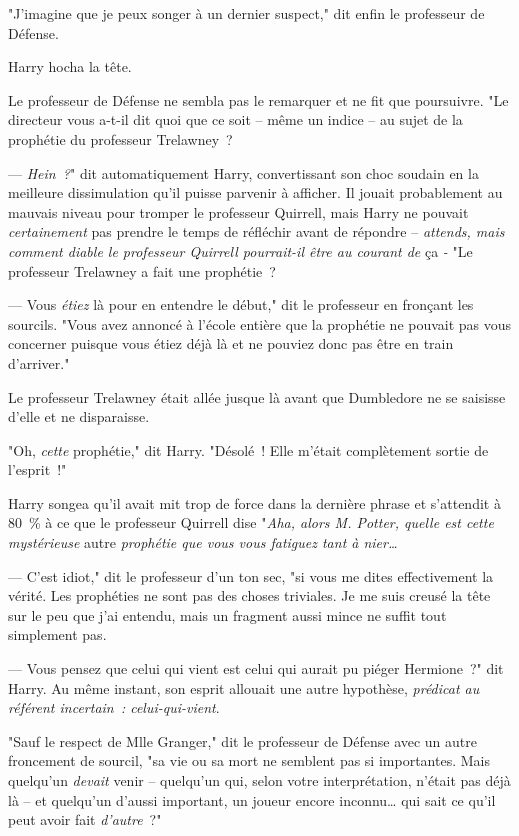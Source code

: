 "J'imagine que je peux songer à un dernier suspect," dit enfin le professeur de Défense.

Harry hocha la tête.

Le professeur de Défense ne sembla pas le remarquer et ne fit que poursuivre. "Le directeur vous a-t-il dit quoi que ce soit -- même un indice -- au sujet de la prophétie du professeur Trelawney~?

--- \emph{Hein~?}" dit automatiquement Harry, convertissant son choc soudain en la meilleure dissimulation qu'il puisse parvenir à afficher. Il jouait probablement au mauvais niveau pour tromper le professeur Quirrell, mais Harry ne pouvait \emph{certainement} pas prendre le temps de réfléchir avant de répondre -- \emph{attends, mais comment diable le professeur Quirrell pourrait-il être au courant de} ça \emph{-} "Le professeur Trelawney a fait une prophétie~?

--- Vous \emph{étiez} là pour en entendre le début," dit le professeur en fronçant les sourcils. "Vous avez annoncé à l'école entière que la prophétie ne pouvait pas vous concerner puisque vous étiez déjà là et ne pouviez donc pas être en train d'arriver."


Le professeur Trelawney était allée jusque là avant que Dumbledore ne se saisisse d'elle et ne disparaisse.

"Oh, \emph{cette} prophétie," dit Harry. "Désolé~! Elle m'était complètement sortie de l'esprit~!"

Harry songea qu'il avait mit trop de force dans la dernière phrase et s'attendit à 80~\% à ce que le professeur Quirrell dise "\emph{Aha, alors M. Potter, quelle est cette mystérieuse} autre \emph{prophétie que vous vous fatiguez tant à nier…}

--- C'est idiot," dit le professeur d'un ton sec, "si vous me dites effectivement la vérité. Les prophéties ne sont pas des choses triviales. Je me suis creusé la tête sur le peu que j'ai entendu, mais un fragment aussi mince ne suffit tout simplement pas.

--- Vous pensez que celui qui vient est celui qui aurait pu piéger Hermione~?" dit Harry. Au même instant, son esprit allouait une autre hypothèse, \emph{prédicat au référent incertain~: celui-qui-vient}.

"Sauf le respect de Mlle Granger," dit le professeur de Défense avec un autre froncement de sourcil, "sa vie ou sa mort ne semblent pas si importantes. Mais quelqu'un \emph{devait} venir -- quelqu'un qui, selon votre interprétation, n'était pas déjà là -- et quelqu'un d'aussi important, un joueur encore inconnu… qui sait ce qu'il peut avoir fait \emph{d'autre}~?"

